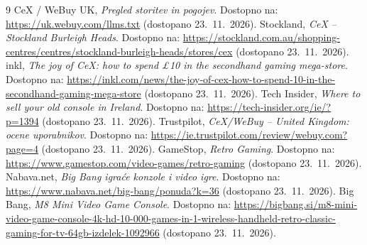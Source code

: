 \documentclass[11pt,a4paper]{article}
\begin{document}
\begin{thebibliography}{9}
 CeX / WeBuy UK, \emph{Pregled storitev in pogojev}. Dostopno na: \url{https://uk.webuy.com/llms.txt} (dostopano 23.~11.~2026).
 Stockland, \emph{CeX -- Stockland Burleigh Heads}. Dostopno na: \url{https://stockland.com.au/shopping-centres/centres/stockland-burleigh-heads/stores/cex} (dostopano 23.~11.~2026).
 inkl, \emph{The joy of CeX: how to spend £10 in the secondhand gaming mega-store}. Dostopno na: \url{https://inkl.com/news/the-joy-of-cex-how-to-spend-10-in-the-secondhand-gaming-mega-store} (dostopano 23.~11.~2026).
 Tech Insider, \emph{Where to sell your old console in Ireland}. Dostopno na: \url{https://tech-insider.org/ie/?p=1394} (dostopano 23.~11.~2026).
 Trustpilot, \emph{CeX/WeBuy -- United Kingdom: ocene uporabnikov}. Dostopno na: \url{https://ie.trustpilot.com/review/webuy.com?page=4} (dostopano 23.~11.~2026).
 GameStop, \emph{Retro Gaming}. Dostopno na: \url{https://www.gamestop.com/video-games/retro-gaming} (dostopano 23.~11.~2026).
 Nabava.net, \emph{Big Bang igraće konzole i video igre}. Dostopno na: \url{https://www.nabava.net/big-bang/ponuda?k=36} (dostopano 23.~11.~2026).
 Big Bang, \emph{M8 Mini Video Game Console}. Dostopno na: \url{https://bigbang.si/m8-mini-video-game-console-4k-hd-10-000-games-in-1-wireless-handheld-retro-classic-gaming-for-tv-64gb-izdelek-1092966} (dostopano 23.~11.~2026).
\end{thebibliography}
\end{document}
